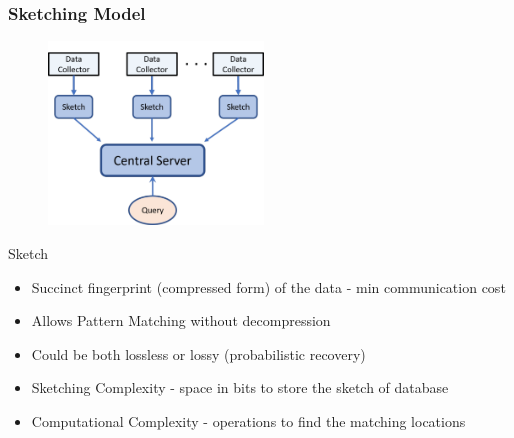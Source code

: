 \documentclass[10pt,xcolor=table]{beamer}
\begin{document}
\begin{frame} \frametitle{Sketching Model}
		\vspace{-10pt}
	\begin{figure}
		\includegraphics[width=2.25in]{SketchingModel.pdf}
	\end{figure}
	\vspace{-8pt}
	\begin{block}{Sketch}
		\begin{itemize}
			\item Succinct fingerprint (compressed form) of the data - min communication cost
			\item Allows Pattern Matching without decompression
			\item Could be both lossless or lossy (probabilistic recovery)
			\item \alert{Sketching Complexity} - space in bits to store the sketch of database
            \item \alert{Computational Complexity} - operations to find the matching locations
		\end{itemize}
	\end{block}
\end{frame}
\end{document}
